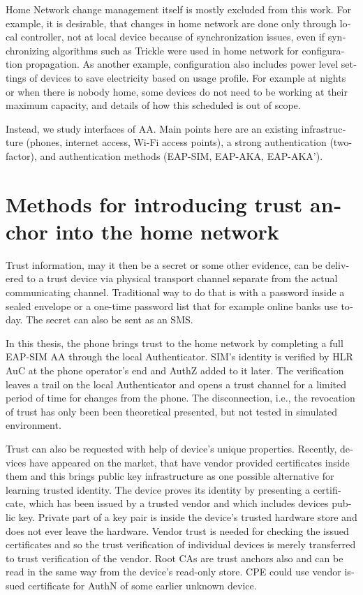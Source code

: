 \documentclass[12pt,a4paper,english]{tutthesis}
\begin{document}
\begin{otherlanguage}{english}
Home Network change management itself is mostly excluded from this work.
For example, 
it is desirable, that changes in home network are done only through
local controller, not at local device because of
synchronization issues, even 
if synchronizing algorithms such as Trickle\cite{rfc6206} were used in
home network for configuration propagation. As another example,
configuration also includes
power level settings of devices to save electricity based on usage
profile. For example at nights or when there is nobody home, some
devices do not need to be working at their maximum capacity, and
details of how this scheduled is out of scope.

Instead, we study interfaces of AA.  Main points here are an existing
infrastructure (phones, internet access, Wi-Fi access points),  a strong
authentication (two-factor), and authentication methods
(EAP-SIM, EAP-AKA, EAP-AKA').

\section{Methods for introducing trust anchor into the home network}
\label{sec-3-3}
\label{sec:altmethods}

 Trust information, may it then be a secret or some
other evidence, can be delivered to a trust device via physical
transport channel separate from the actual communicating channel.
Traditional way to do that is with a password inside a sealed
envelope or a one-time password list that for example online banks 
use today. The secret can also be sent as an SMS.

In this thesis,
the phone brings trust to the home network by completing a full EAP-SIM
AA through the local Authenticator. SIM's identity is verified by HLR
AuC at the phone operator's end and AuthZ added to it later. The
verification leaves a trail on the local Authenticator and opens a
trust channel for a limited period of time for changes from the phone.
The disconnection, i.e., the revocation of trust has only been been theoretical presented,
but not tested in simulated environment.




Trust can also be requested with help of device's unique
properties. Recently, devices have appeared on the market, that have
vendor provided certificates inside them and this brings public key
infrastructure as one possible alternative for learning trusted
identity.  The device proves its identity by presenting a certificate,
which has been issued by a trusted vendor and which includes devices
public key.  Private part of a key pair is inside the device's trusted
hardware store and does not ever leave the hardware. Vendor trust is
needed for checking the issued certificates and so the trust
verification of individual devices is merely transferred to trust
verification of the vendor.  Root CAs are trust anchors also and can
be read in the same way from the device's read-only store.  CPE could
use vendor issued certificate for AuthN of some earlier unknown
device.



\end{otherlanguage}
\end{document}
